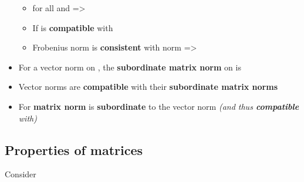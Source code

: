 \begin{itemize}
            \begin{itemize}

                  \item
                        for all  and
                         =>
                  \item
                        If  is \textbf{compatible} with
                  \item
                        Frobenius norm is \textbf{consistent} with  norm
                        => 
            \end{itemize}
      \item
            For a vector norm \iMbox{\|\cdot\|} on , the
            \textbf{subordinate matrix norm} \iMbox{\|\cdot\|} on
             is

      \item
            Vector norms are \textbf{compatible} with their \textbf{subordinate
                  matrix norms}
      \item
            For  \textbf{matrix norm}  is
            \textbf{subordinate} to the vector norm  \emph{(and
                  thus \textbf{compatible} with)}
\end{itemize}

\subsection*{Properties of matrices}

Consider 

